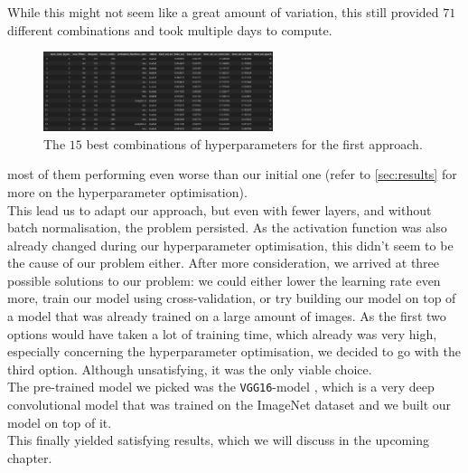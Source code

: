 While this might not seem like a great amount of variation, this still provided $71$ different combinations and took multiple days to compute.



\begin{figure}
    \centering
    \includegraphics[width=0.6\textwidth]{images/hyperparameter_optimisation_1.png}
    \caption{The $15$ best combinations of hyperparameters for the first approach.}
    \label{fig:hyperparameter_optimisation_1}
\end{figure}


most of them performing even worse than our initial one (refer to \autoref{sec:results} for more on the hyperparameter optimisation). \\

This lead us to adapt our approach, but even with fewer layers, and without batch normalisation, the problem persisted.
As the activation function was also already changed during our hyperparameter optimisation, this didn't seem to be the cause of our problem either.
After more consideration, we arrived at three possible solutions to our problem: we could either lower the learning rate even more, train our model using cross-validation,
or try building our model on top of a model that was already trained on a large amount of images.
As the first two options would have taken a lot of training time, which already was very high, especially concerning the hyperparameter optimisation,
we decided to go with the third option.
Although unsatisfying, it was the only viable choice. \\

The pre-trained model we picked was the \texttt{VGG16}-model \cite{VGG16source}, which is a very deep convolutional model that was trained on the ImageNet dataset
and we built our model on top of it. \\

This finally yielded satisfying results, which we will discuss in the upcoming chapter.

